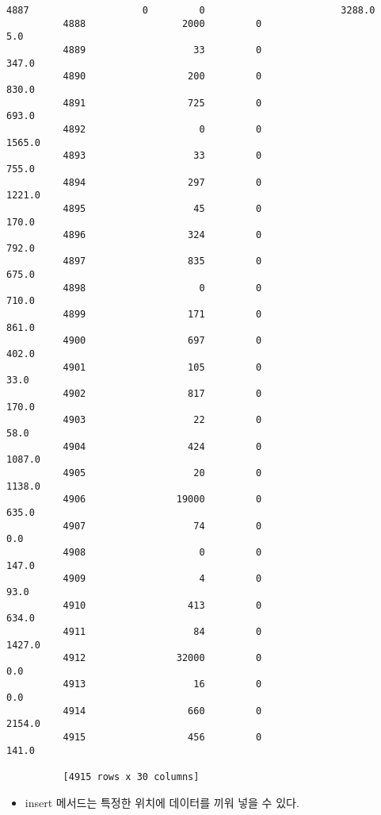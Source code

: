 \documentclass[11pt]{article}
\providecommand{\tightlist}{%
      \setlength{\itemsep}{0pt}\setlength{\parskip}{0pt}}
\begin{document}
\begin{Verbatim}[commandchars=\\\{\}]
          4887                    0         0                        3288.0  
          4888                 2000         0                           5.0  
          4889                   33         0                         347.0  
          4890                  200         0                         830.0  
          4891                  725         0                         693.0  
          4892                    0         0                        1565.0  
          4893                   33         0                         755.0  
          4894                  297         0                        1221.0  
          4895                   45         0                         170.0  
          4896                  324         0                         792.0  
          4897                  835         0                         675.0  
          4898                    0         0                         710.0  
          4899                  171         0                         861.0  
          4900                  697         0                         402.0  
          4901                  105         0                          33.0  
          4902                  817         0                         170.0  
          4903                   22         0                          58.0  
          4904                  424         0                        1087.0  
          4905                   20         0                        1138.0  
          4906                19000         0                         635.0  
          4907                   74         0                           0.0  
          4908                    0         0                         147.0  
          4909                    4         0                          93.0  
          4910                  413         0                         634.0  
          4911                   84         0                        1427.0  
          4912                32000         0                           0.0  
          4913                   16         0                           0.0  
          4914                  660         0                        2154.0  
          4915                  456         0                         141.0  
          
          [4915 rows x 30 columns]
\end{Verbatim}
            
    \begin{itemize}
\tightlist
\item
  insert 메서드는 특정한 위치에 데이터를 끼워 넣을 수 있다.
\end{itemize}
\end{document}

